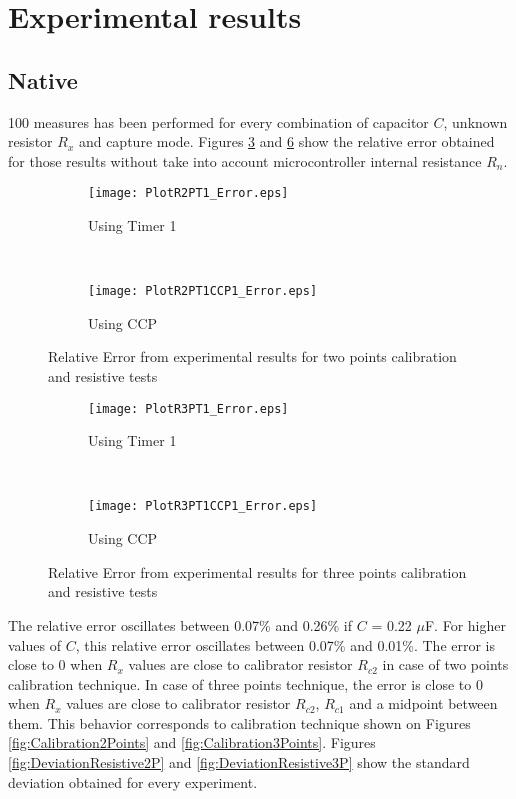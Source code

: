 \section{Experimental results}\label{S:Res:Results}
\subsection{Native}\label{S:Res:Results:Native}
100 measures has been performed for every combination of capacitor $C$, unknown resistor $R_{x}$ and capture mode. Figures \ref{fig:RelativeErrorResistive2P} and \ref{fig:RelativeErrorResistive3P} show the relative error obtained for those results without take into account microcontroller internal resistance $R_{n}$.

\begin{figure}[!htb]
\centering
	\begin{subfigure}{0.45\textwidth}
	\texttt{[image: PlotR2PT1\_Error.eps]}
	\caption{Using Timer 1}
	\label{fig:PlotR2PT1Error}
	\end{subfigure}
	~
	\begin{subfigure}{0.45\textwidth}
	\texttt{[image: PlotR2PT1CCP1\_Error.eps]}
	\caption{Using CCP}
	\label{fig:PlotR2PT1CCP1Error}
	\end{subfigure}
\caption{Relative Error from experimental results for two points calibration and resistive tests}
\label{fig:RelativeErrorResistive2P}
\end{figure}

\begin{figure}[!htb]
\centering
    \begin{subfigure}{0.45\textwidth}
	\texttt{[image: PlotR3PT1\_Error.eps]}
	\caption{Using Timer 1}
	\label{fig:PlotR3PT1Error}
	\end{subfigure}
	~
	\begin{subfigure}{0.45\textwidth}
	\texttt{[image: PlotR3PT1CCP1\_Error.eps]}
	\caption{Using CCP}
	\label{fig:PlotR3PT1CCP1Error}
	\end{subfigure}
\caption{Relative Error from experimental results for three points calibration and resistive tests}
\label{fig:RelativeErrorResistive3P}
\end{figure}

The relative error oscillates between 0.07\% and 0.26\% if $C$ = 0.22 $\mu$F. For higher values of $C$, this relative error oscillates between 0.07\% and 0.01\%. The error is close to 0 when $R_{x}$ values are close to calibrator resistor $R_{c2}$ in case of two points calibration technique. In case of three points technique, the error is close to 0 when $R_{x}$ values are close to calibrator resistor $R_{c2}$, $R_{c1}$ and a midpoint between them. This behavior corresponds to calibration technique shown on Figures \ref{fig:Calibration2Points} and \ref{fig:Calibration3Points}. Figures \ref{fig:DeviationResistive2P} and \ref{fig:DeviationResistive3P} show the standard deviation obtained for every experiment.
\medskip

